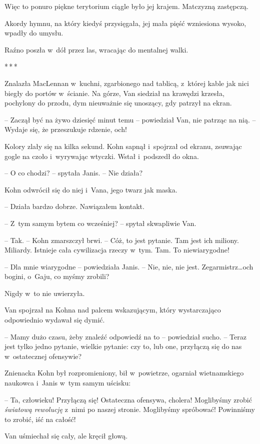\documentclass[oneside,polish,11pt,sfheadings]{mwbk}
\newcommand{\threeast}{\bigskip\par\centerline{*\,*\,*}\medskip\par}%
\begin{document}
Więc to ponuro piękne terytorium ciągle było jej krajem. Matczyzną
zastępczą.

Akordy hymnu, na który kiedyś przysięgała, jej mała pięść wzniesiona
wysoko, wpadły do umysłu.

Raźno poszła w~dół przez las, wracając do mentalnej walki.
  \threeast 

Znalazła MacLennan w~kuchni, zgarbionego nad tablicą, z~której kable jak
nici biegły do portów w~ścianie. Na górze, Van siedział na krawędzi
krzesła, pochylony do przodu, dym nieuważnie się unoszący, gdy patrzył
na ekran.

-- Zaczął być na żywo dziesięć minut temu -- powiedział Van, nie patrząc
na nią. -- Wydaje się, że przeszukuje rdzenie, och!

Kolory zlały się na kilka sekund. Kohn sapnął i~spojrzał od ekranu,
zsuwając gogle na czoło i~wyrywając wtyczki. Wstał i~podszedł do okna.

-- O co chodzi? -- spytała Janis. -- Nie działa?

Kohn odwrócił się do niej i~Vana, jego twarz jak maska.

-- Działa bardzo dobrze. Nawiązałem kontakt.

-- Z~tym samym bytem co wcześniej? -- spytał skwapliwie Van.

-- Tak. -- Kohn zmarszczył brwi. -- Cóż, to jest pytanie. Tam jest ich
miliony. Miliardy. Istnieje cała cywilizacja rzeczy w~tym. Tam. To
niewiarygodne!

-- Dla mnie wiarygodne -- powiedziała Janis. -- Nie, nie, nie jest.
Zegarmistrz\ldots och bogini, o~Gaju, co myśmy zrobili?

Nigdy w~to nie uwierzyła.

Van spojrzał na Kohna nad palcem wskazującym, który wystarczająco
odpowiednio wydawał się dymić.

-- Mamy dużo czasu, żeby znaleźć odpowiedź na to -- powiedział sucho. -- Teraz jest tylko jedno pytanie, wielkie pytanie: czy to, lub one,
przyłączą się do nas w~ostatecznej ofensywie?

Znienacka Kohn był rozpromieniony, bił w~powietrze, ogarniał
wietnamskiego naukowca i~Janis w~tym samym uścisku: 

-- Ta, człowieku!
Przyłączą się! Ostateczna ofensywa, cholera! Moglibyśmy zrobić
\emph{światową rewolucję} z~nimi po naszej stronie. Moglibyśmy
spróbować! Powinniśmy to zrobić, iść na całość!

Van uśmiechał się cały, ale kręcił głową. 
\end{document}
